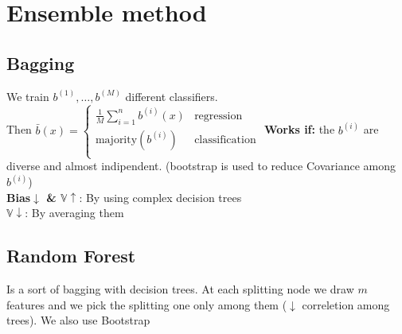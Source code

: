 \section{Ensemble method}

\subsection*{Bagging}
We train $b^{(1)}, \dots, b^{(M)}$ different classifiers. \\
Then \(\bar{b}(x)=
\begin{cases}
	\frac{1}{M}\sum_{i = 1}^n b^{(i)}(x) & \text{regression}\\
	\text{majority}\left(b^{(i)}\right)  & \text{classification}\\
\end{cases}\)
\textbf{Works if:} the $b^{(i)}$ are diverse and almost indipendent.
(bootstrap is used to reduce Covariance among $b^{(i)}$)\\
\textbf{Bias$\downarrow$ \& $\mathbb{V} \uparrow$}: By using complex decision trees\\
\textbf{$\mathbb{V}\downarrow$}: By averaging them

\subsection*{Random Forest}
Is a sort of bagging with decision trees. 
At each splitting node we draw $m$ features and we pick the splitting one only among them ($\downarrow$ correletion among trees). 
We also use Bootstrap

